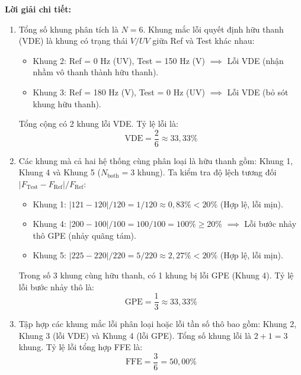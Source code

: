 \noindent\textbf{Lời giải chi tiết:}
\begin{enumerate}[label=\alph*)]
    \item Tổng số khung phân tích là $N = 6$. Khung mắc lỗi quyết định hữu thanh (VDE) là khung có trạng thái $V/UV$ giữa Ref và Test khác nhau:
    \begin{itemize}[leftmargin=1.5em, itemsep=2pt]
        \item Khung 2: Ref = 0 Hz (UV), Test = 150 Hz (V) $\implies$ Lỗi VDE (nhận nhầm vô thanh thành hữu thanh).
        \item Khung 3: Ref = 180 Hz (V), Test = 0 Hz (UV) $\implies$ Lỗi VDE (bỏ sót khung hữu thanh).
    \end{itemize}
    Tổng cộng có 2 khung lỗi VDE. Tỷ lệ lỗi là:
    \begin{equation}
        \text{VDE} = \frac{2}{6} \approx 33{,}33\%
    \end{equation}

    \item Các khung mà cả hai hệ thống cùng phân loại là hữu thanh gồm: Khung 1, Khung 4 và Khung 5 ($N_{\text{both}} = 3$ khung). Ta kiểm tra độ lệch tương đối $|F_{\text{Test}} - F_{\text{Ref}}| / F_{\text{Ref}}$:
    \begin{itemize}[leftmargin=1.5em, itemsep=2pt]
        \item Khung 1: $|121 - 120| / 120 = 1 / 120 \approx 0{,}83\% < 20\%$ (Hợp lệ, lỗi mịn).
        \item Khung 4: $|200 - 100| / 100 = 100 / 100 = 100\% \ge 20\%$ $\implies$ Lỗi bước nhảy thô GPE (nhảy quãng tám).
        \item Khung 5: $|225 - 220| / 220 = 5 / 220 \approx 2{,}27\% < 20\%$ (Hợp lệ, lỗi mịn).
    \end{itemize}
    Trong số 3 khung cùng hữu thanh, có 1 khung bị lỗi GPE (Khung 4). Tỷ lệ lỗi bước nhảy thô là:
    \begin{equation}
        \text{GPE} = \frac{1}{3} \approx 33{,}33\%
    \end{equation}

    \item Tập hợp các khung mắc lỗi phân loại hoặc lỗi tần số thô bao gồm: Khung 2, Khung 3 (lỗi VDE) và Khung 4 (lỗi GPE). Tổng số khung lỗi là $2 + 1 = 3$ khung. Tỷ lệ lỗi tổng hợp FFE là:
    \begin{equation}
        \text{FFE} = \frac{3}{6} = 50{,}00\%
    \end{equation}


\end{enumerate}
